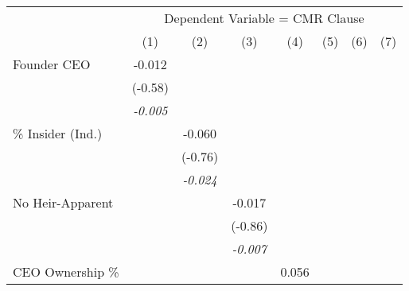 {
\def\sym#1{\ifmmode^{#1}\else\(^{#1}\)\fi}
\begin{tabular}{l*{7}{c}}
\toprule
                &\multicolumn{7}{c}{Dependent Variable = CMR Clause}                                                                                 \\\cmidrule(lr){2-8}
                &\multicolumn{1}{c}{(1)}         &\multicolumn{1}{c}{(2)}         &\multicolumn{1}{c}{(3)}         &\multicolumn{1}{c}{(4)}         &\multicolumn{1}{c}{(5)}         &\multicolumn{1}{c}{(6)}         &\multicolumn{1}{c}{(7)}         \\

\midrule Founder CEO   &   -0.012         &                  &                  &                  &                  &                  &                  \\
                &  (-0.58)         &                  &                  &                  &                  &                  &                  \\
                &\textit{-0.005}         &                  &                  &                  &                  &                  &                  \\
\% Insider (Ind.)&                  &   -0.060         &                  &                  &                  &                  &                  \\
                &                  &  (-0.76)         &                  &                  &                  &                  &                  \\
                &                  &\textit{-0.024}         &                  &                  &                  &                  &                  \\
No Heir-Apparent&                  &                  &   -0.017         &                  &                  &                  &                  \\
                &                  &                  &  (-0.86)         &                  &                  &                  &                  \\
                &                  &                  &\textit{-0.007}         &                  &                  &                  &                  \\
CEO Ownership \%&                  &                  &                  &    0.056         &                  &                  &                  \\

\end{tabular}}
